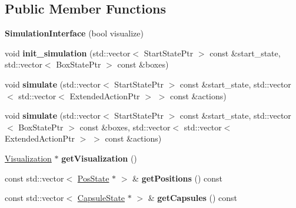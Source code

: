 \subsection*{Public Member Functions}
\begin{DoxyCompactItemize}
\item 
\hypertarget{classCartWheel_1_1SimulationInterface_ac722c8f5c251a73e904d87f9a57a91af}{
{\bfseries SimulationInterface} (bool visualize)}
\label{classCartWheel_1_1SimulationInterface_ac722c8f5c251a73e904d87f9a57a91af}

\item 
\hypertarget{classCartWheel_1_1SimulationInterface_a02313593cfd47332186dafd35c7bceb1}{
void {\bfseries init\_\-simulation} (std::vector$<$ StartStatePtr $>$ const \&start\_\-state, std::vector$<$ BoxStatePtr $>$ const \&boxes)}
\label{classCartWheel_1_1SimulationInterface_a02313593cfd47332186dafd35c7bceb1}

\item 
\hypertarget{classCartWheel_1_1SimulationInterface_adb0b5b3c8f2e731667288d970c97b9ef}{
void {\bfseries simulate} (std::vector$<$ StartStatePtr $>$ const \&start\_\-state, std::vector$<$ std::vector$<$ ExtendedActionPtr $>$ $>$ const \&actions)}
\label{classCartWheel_1_1SimulationInterface_adb0b5b3c8f2e731667288d970c97b9ef}

\item 
\hypertarget{classCartWheel_1_1SimulationInterface_abae63cdcdbf66f580ea0beb68d34fa11}{
void {\bfseries simulate} (std::vector$<$ StartStatePtr $>$ const \&start\_\-state, std::vector$<$ BoxStatePtr $>$ const \&boxes, std::vector$<$ std::vector$<$ ExtendedActionPtr $>$ $>$ const \&actions)}
\label{classCartWheel_1_1SimulationInterface_abae63cdcdbf66f580ea0beb68d34fa11}

\item 
\hypertarget{classCartWheel_1_1SimulationInterface_a1289089bff3e70ded6bc0218039c2c6f}{
\hyperlink{classCartWheel_1_1Visualization}{Visualization} $\ast$ {\bfseries getVisualization} ()}
\label{classCartWheel_1_1SimulationInterface_a1289089bff3e70ded6bc0218039c2c6f}

\item 
\hypertarget{classCartWheel_1_1SimulationInterface_a03a5406bab13feafe404360885ebf3df}{
const std::vector$<$ \hyperlink{classCartWheel_1_1PosState}{PosState} $\ast$ $>$ \& {\bfseries getPositions} () const }
\label{classCartWheel_1_1SimulationInterface_a03a5406bab13feafe404360885ebf3df}

\item 
\hypertarget{classCartWheel_1_1SimulationInterface_a7418cafdc7bdb5ab93d49566c405139e}{
const std::vector$<$ \hyperlink{classCartWheel_1_1CapsuleState}{CapsuleState} $\ast$ $>$ \& {\bfseries getCapsules} () const }
\label{classCartWheel_1_1SimulationInterface_a7418cafdc7bdb5ab93d49566c405139e}


\end{DoxyCompactItemize}
